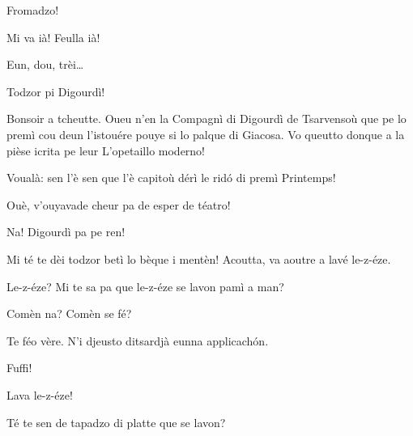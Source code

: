 \begin{drama}

\Fotografespeaks{} Fromadzo!

\Tcheuttespeaks {} Mi va ià! Feulla ià!


\Joelspeaks Eun, dou, trèi\ldots

\Tcheuttespeaks{} Todzor pi Digourdì!



\Joelspeaks Bonsoir a tcheutte. Oueu n'en la Compagnì di Digourdì de Tsarvensoù que pe lo premì cou deun l'istouére pouye si lo palque di Giacosa. Vo queutto donque a la pièse icrita pe leur \og L'opetaillo moderno\fg{}!



\Maganspeaks Voualà: sen l'è sen que l'è capitoù dérì le rid\'o di premì Printemps!

\Nevaouspeaks{} Ouè, v'ouyavade cheur pa de esper de téatro!

\Maganspeaks Na! Digourdì pa pe ren!

\Paganspeaks{}  Mi té te dèi todzor betì lo bèque i mentèn! Acoutta, va aoutre a lavé le-z-éze.

\Maganspeaks Le-z-éze? Mi te sa pa que le-z-éze se lavon pamì a man?

\Paganspeaks Comèn na? Comèn se fé?

\Maganspeaks Te féo vère.  N'i djeusto ditsardjà eunna applicach\'on.


\Maganspeaks{} Fuffi!


\Maganspeaks{} Lava le-z-éze!


\Maganspeaks{} Té te sen de tapadzo di platte que se lavon?


\end{drama}
